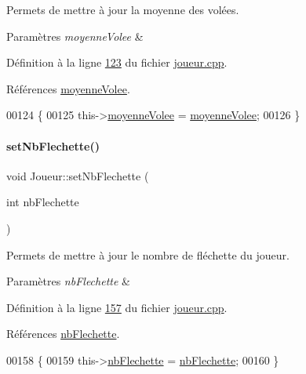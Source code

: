 Permets de mettre à jour la moyenne des volées. 


\begin{DoxyParams}{Paramètres}
{\em moyenne\+Volee} & \\
\hline
\end{DoxyParams}


Définition à la ligne \hyperlink{joueur_8cpp_source_l00123}{123} du fichier \hyperlink{joueur_8cpp_source}{joueur.\+cpp}.



Références \hyperlink{joueur_8h_source_l00044}{moyenne\+Volee}.


\begin{DoxyCode}
00124 \{
00125     this->\hyperlink{class_joueur_ac5641a2a8fc1deebe5bba27bf21eb446}{moyenneVolee} = \hyperlink{class_joueur_ac5641a2a8fc1deebe5bba27bf21eb446}{moyenneVolee};
00126 \}
\end{DoxyCode}
\mbox{\label{class_joueur_a3220b85c9480a2178764ef58029108aa}} 
\paragraph{\texorpdfstring{set\+Nb\+Flechette()}{setNbFlechette()}}
{\footnotesize\ttfamily void Joueur\+::set\+Nb\+Flechette (\begin{DoxyParamCaption}\item[{int}]{nb\+Flechette }\end{DoxyParamCaption})}



Permets de mettre à jour le nombre de fléchette du joueur. 


\begin{DoxyParams}{Paramètres}
{\em nb\+Flechette} & \\
\hline
\end{DoxyParams}


Définition à la ligne \hyperlink{joueur_8cpp_source_l00157}{157} du fichier \hyperlink{joueur_8cpp_source}{joueur.\+cpp}.



Références \hyperlink{joueur_8h_source_l00046}{nb\+Flechette}.


\begin{DoxyCode}
00158 \{
00159     this->\hyperlink{class_joueur_a330099a1952fbf97b2faea2c640b32f5}{nbFlechette} = \hyperlink{class_joueur_a330099a1952fbf97b2faea2c640b32f5}{nbFlechette};
00160 \}
\end{DoxyCode}
\mbox{\label{class_joueur_aa7d833f3aa6058cd51a30c7e6270e696}} 

